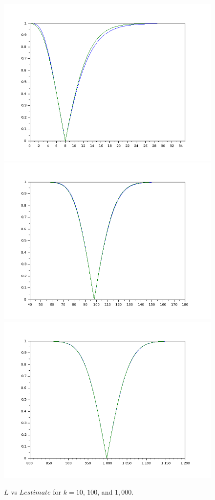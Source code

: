 \begin{figure}
\begin{center}
\includegraphics[width=0.75\linewidth]{img/chi2est10.png}
\includegraphics[width=0.75\linewidth]{img/chi2est100.png}
\includegraphics[width=0.75\linewidth]{img/chi2est1000.png}
\end{center}
\caption{$L$ vs $Lestimate$ for $k=10$, $100$, and $1,000$.}
\label{fig:chi2est}
\end{figure}

